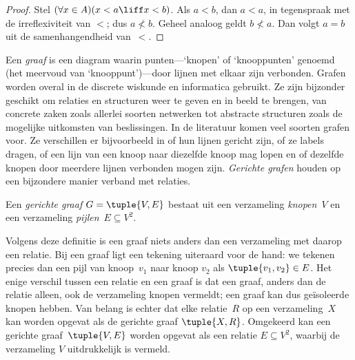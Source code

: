 \documentclass[openany]{memoir}
\begin{document}
\begin{proof}
Stel $(\forall x \in A)(x < a \liff x < b)$. Als $a < b$, dan $a <
a$, in tegenspraak met de irreflexiviteit van $<$; dus $a \nless b$.
Geheel analoog geldt $b \nless a$. Dan volgt $a = b$ uit de samenhangendheid
van~$<$.
\end{proof}
\endgroup

\begingroup
\def\olfilename{OLP-0017}
\def\olfilepath{content/sets-functions-relations/relations/}
\hypertarget{unit-OLP-0017}{}




Een \emph{graaf} is een diagram waarin punten---‘knopen’ of
‘knooppunten’ genoemd (het meervoud van ‘knooppunt’)---door lijnen met
elkaar zijn verbonden. Grafen worden overal in de discrete wiskunde
en informatica gebruikt. Ze zijn bijzonder geschikt om relaties en
structuren weer te geven en in beeld te brengen, van concrete zaken
zoals allerlei soorten netwerken tot abstracte structuren zoals de
mogelijke uitkomsten van beslissingen. In de literatuur komen veel
soorten grafen voor. Ze verschillen er bijvoorbeeld in of hun
lijnen gericht zijn, of ze labels dragen, of een lijn van een knoop
naar diezelfde knoop mag lopen en of dezelfde knopen door meerdere
lijnen verbonden mogen zijn. \emph{Gerichte grafen} houden op een
bijzondere manier verband met relaties.

\begin{defn}
Een \emph{gerichte graaf} $G = \tuple{V, E}$ bestaat uit een
verzameling \emph{knopen}~$V$ en een verzameling
\emph{pijlen}~$E \subseteq V^2$.
\end{defn}

\begin{explain}
Volgens deze definitie is een graaf niets anders dan een verzameling
met daarop een relatie. Bij een graaf ligt een tekening uiteraard voor
de hand: we tekenen precies dan een pijl van knoop~$v_1$ naar knoop
$v_2$ als $\tuple{v_1, v_2} \in E$. Het enige verschil tussen een
relatie en een graaf is dat een graaf, anders dan de relatie alleen,
ook de verzameling knopen vermeldt; een graaf kan dus geïsoleerde
knopen hebben. Van
belang is echter dat elke relatie~$R$ op een verzameling~$X$ kan
worden opgevat als de gerichte graaf $\tuple{X, R}$. Omgekeerd kan een
gerichte graaf~$\tuple{V, E}$ worden opgevat als een relatie
$E \subseteq V^2$, waarbij de verzameling $V$ uitdrukkelijk is
vermeld.
\end{explain}
\end{document}
